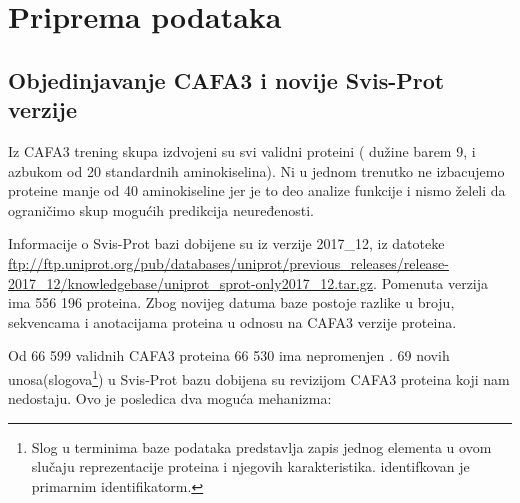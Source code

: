 
\chapter{Priprema podataka} %

\label{Priprema_podataka} %








\section{Objedinjavanje CAFA3 i novije Svis-Prot verzije}

Iz CAFA3 trening skupa izdvojeni su svi validni proteini ( dužine barem 9, i
azbukom od 20 standardnih aminokiselina). Ni u jednom trenutko ne izbacujemo
proteine manje od 40 aminokiseline jer je to deo analize funkcije i nismo želeli
da ograničimo skup mogućih predikcija neuređenosti.

Informacije o Svis-Prot bazi dobijene su iz verzije 2017\_12, iz datoteke
\url{ftp://ftp.uniprot.org/pub/databases/uniprot/previous_releases/release-2017_12/knowledgebase/uniprot_sprot-only2017_12.tar.gz}.
Pomenuta verzija ima 556 196 proteina. Zbog novijeg datuma baze postoje razlike
u broju, sekvencama i  anotacijama proteina u odnosu na CAFA3 verzije proteina.

Od 66 599 validnih CAFA3 proteina 66 530 ima nepromenjen  .  69 novih unosa(slogova\footnote{ Slog
   u terminima baze podataka predstavlja zapis jednog elementa u
ovom slučaju reprezentacije proteina i njegovih karakteristika.  identifkovan
je primarnim identifikatorm.  }) u Svis-Prot bazu dobijena su revizijom CAFA3
proteina koji nam nedostaju.  Ovo je posledica dva moguća mehanizma:

